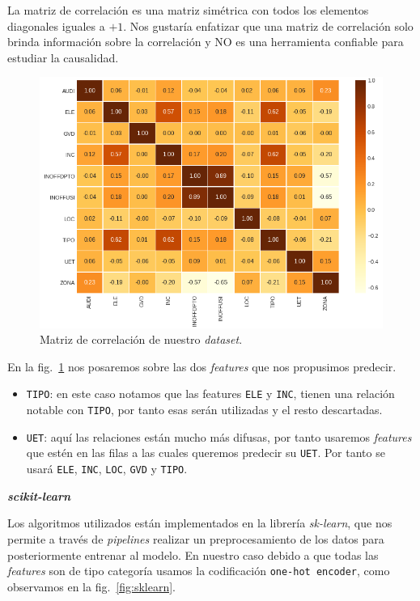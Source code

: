 \documentclass[a4paper,12pt]{article}
\begin{document}
La matriz de correlación es una matriz simétrica con todos los elementos diagonales iguales a $+1$. Nos gustaría enfatizar que una matriz de correlación solo brinda información sobre la correlación y NO es una herramienta confiable para estudiar la causalidad. 

\begin{figure}[H]
	\begin{center}
	\includegraphics[width=1\textwidth]{corrmatrix.png}
  	\caption{Matriz de correlación de nuestro \textit{dataset}.}
  	\label{fig:corrmatrix}
  	\end{center}
\end{figure}

En la fig.~\ref{fig:corrmatrix} nos posaremos sobre las dos \textit{features} que nos propusimos predecir.

\begin{itemize}
	\item \texttt{TIPO}: en este caso notamos que las features \texttt{ELE} y \texttt{INC}, tienen una relación notable con \texttt{TIPO}, por tanto esas serán utilizadas y el resto descartadas.
	\item \texttt{UET}: aquí las relaciones están mucho más difusas, por tanto usaremos \textit{features} que estén en las filas a las cuales queremos predecir su \texttt{UET}. Por tanto se usará \texttt{ELE}, \texttt{INC}, \texttt{LOC}, \texttt{GVD} y \texttt{TIPO}.
\end{itemize}

\textbf{\textit{scikit-learn}}

Los algoritmos utilizados están implementados en la librería \textit{sk-learn}, que nos permite a través de \textit{pipelines} realizar un preprocesamiento de los datos para posteriormente entrenar al modelo. En nuestro caso debido a que todas las \textit{features} son de tipo categoría usamos la codificación \texttt{one-hot encoder}, como observamos en la fig.~\ref{fig:sklearn}.
\end{document}

